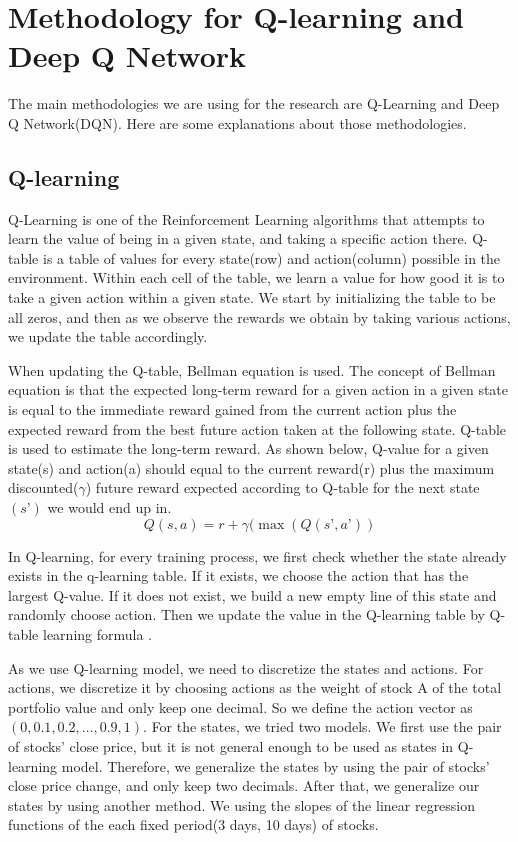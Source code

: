 \chapter{Methodology for Q-learning and Deep Q Network}
\label{Ch:methodology}

The main methodologies we are using for the research are Q-Learning and Deep Q Network(DQN). Here are some explanations about those methodologies.

\section{Q-learning}
Q-Learning is one of the Reinforcement Learning algorithms that attempts to learn the value of being in a given state, and taking a specific action there. Q-table is a table of values for every state(row) and action(column) possible in the environment. Within each cell of the table, we learn a value for how good it is to take a given action within a given state.  We start by initializing the table to be all zeros, and then as we observe the rewards we obtain by taking various actions, we update the table accordingly.

When updating the Q-table, Bellman equation is used. The concept of Bellman equation is that the expected long-term reward for a given action in a given state is equal to the immediate reward gained from the current action plus the expected reward from the best future action taken at the following state. Q-table is used to estimate the long-term reward. As shown below, Q-value for a given state(s) and action(a) should equal to the current reward(r) plus the maximum discounted($\gamma$) future reward expected according to Q-table for the next state$(s’)$ we would end up in. 
$$Q(s,a) = r + \gamma (\max (Q(s’,a’))$$

In Q-learning, for every training process, we first check whether the state already exists in the q-learning table. If it exists, we choose the action that has the largest Q-value. If it does not exist, we build a new empty line of this state and randomly choose action. Then we update the value in the Q-learning table by  Q-table learning formula .

As we use Q-learning model, we need to discretize the states and actions. For actions, we discretize it by choosing actions as the weight of stock A of the total portfolio value and only keep one decimal. So we define the action vector as $(0, 0.1, 0.2, …, 0.9, 1)$. For the states, we tried two models. We first use the pair of stocks’ close price, but it is not general enough to be used as states in Q-learning model. Therefore, we generalize the states by using the pair of stocks' close price change, and only keep two decimals. After that, we generalize our states by using another method. We using the slopes of the linear regression functions of the each fixed period(3 days, 10 days) of stocks.

